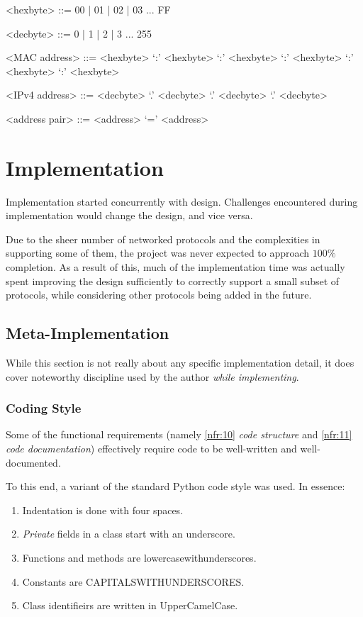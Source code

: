 \documentclass[10pt,a4paper,notitlepage,twoside]{report}
\begin{document}
\begin{grammar}
<hexbyte> ::= 00 | 01 | 02 | 03 ... FF

<decbyte> ::= 0 | 1 | 2 | 3 ... 255

<MAC address> ::= <hexbyte> `:' <hexbyte> `:' <hexbyte> `:' <hexbyte> `:' <hexbyte> `:' <hexbyte>

<IPv4 address> ::= <decbyte> `.' <decbyte> `.' <decbyte> `.' <decbyte>

<address pair> ::= <address> `=' <address>
\end{grammar}

\chapter{Implementation}
Implementation started concurrently with design. Challenges encountered during implementation would change the design, and vice versa.

Due to the sheer number of networked protocols and the complexities in supporting some of them, the project was never expected to approach $100\%$ completion. As a result of this, much of the implementation time was actually spent improving the design sufficiently to correctly support a small subset of protocols, while considering other protocols being added in the future.

\section{Meta-Implementation}
While this section is not really about any specific implementation detail, it does cover noteworthy discipline used by the author \emph{while implementing}.

\subsection{Coding Style}
Some of the functional requirements (namely \ref{nfr:10} \emph{code structure} and \ref{nfr:11} \emph{code documentation}) effectively require code to be well-written and well-documented.

To this end, a variant of the standard Python code style was used. In essence:
\begin{enumerate}[label=\roman*)]
\item Indentation is done with four spaces.\\
\item \emph{Private} fields in a class start with an underscore.\\
\item Functions and methods are lower\textunderscore{}case\textunderscore{}with\textunderscore{}underscores.\\
\item Constants are CAPITALS\textunderscore{}WITH\textunderscore{}UNDERSCORES.\\
\item Class identifieirs are written in UpperCamelCase.
\end{enumerate}
\end{document}
